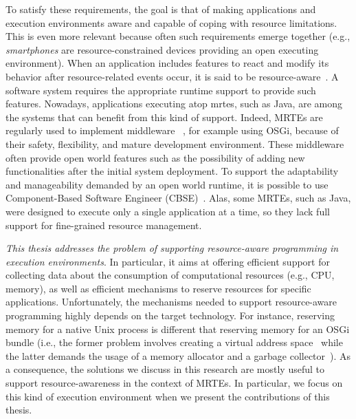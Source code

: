 To satisfy these requirements, the goal is that of making applications and execution environments aware and capable of coping with resource limitations.
This is even more relevant because often such requirements emerge together
(e.g., \textit{smartphones} are resource-constrained devices providing an open executing environment).
When an application includes features to react and modify its behavior after resource-related events occur, it is said to be resource-aware~\cite{Boldrini:2008:CRA:1549824.1550106,Peddemors:2007:NRA:1256316.1256338,Alhaisoni:2010:RTO:1664767.1664770,Polo:2011:RAS:2414338.2414352,Bulej:2012:PAC:2408860.2410068,autili2012hybrid}.
A software system requires the appropriate runtime support to provide such features.
Nowadays, applications executing atop \glspl{mrte}, such as Java, are among the systems that can benefit from this kind of support.
Indeed, MRTEs are regularly used to implement middleware ~\cite{Bruneton:2006:FCM:1152333.1152345,Fouquet:2014:DED:2602576.2611461,OracleEJB3.0,Becker:2010:PCM:1712605.1712651,Carlson2006127}, for example using OSGi, because of their safety, flexibility, and mature development environment.
These middleware often provide open world features such as the possibility of adding new functionalities after the initial system deployment.
To support the adaptability and manageability demanded by an open world runtime, it is possible to use  Component-Based Software Engineer (CBSE)~\cite{gruntz2002component,Duclos:2002:DUN:508386.508394, Bruneton:2006:FCM:1152333.1152345}.
Alas, some MRTEs, such as Java, were designed to execute only a single application at a time, so they lack full support for fine-grained resource management.

  
\textit{This thesis addresses the problem of supporting resource-aware programming in execution environments}.
In particular, it aims at offering efficient support for collecting data about the consumption of computational resources (e.g., CPU, memory), as well as efficient mechanisms to reserve resources for specific applications.
Unfortunately, the mechanisms needed to support resource-aware programming highly depends on the target technology.
For instance, reserving memory for a native Unix process is different that reserving memory for an OSGi bundle (i.e., the former problem involves creating a virtual address space~\cite{Stallings2014} while the latter demands the usage of a memory allocator and a garbage collector~\cite{OSGiAlliance2014,alpern2000jalapeno,Richard2012,Geoffray:2010:VSM:1837854.1736006}).
As a consequence, the solutions we discuss in this research are mostly useful to support resource-awareness in the context of MRTEs.
In particular, we focus on this kind of execution environment when we present the contributions of this thesis.


